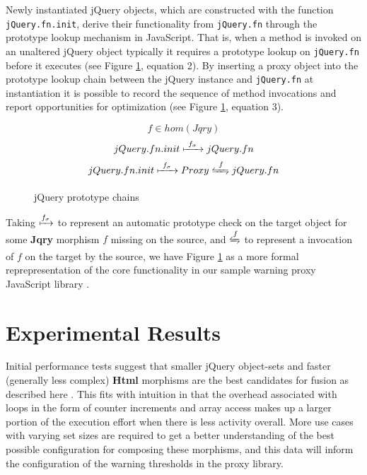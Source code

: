 \documentclass[preprint]{sigplanconf}
\begin{document}
Newly instantiated jQuery objects, which are constructed with the function \verb|jQuery.fn.init|, derive their functionality from \verb|jQuery.fn| through the prototype lookup mechanism in JavaScript. That is, when a method is invoked on an unaltered jQuery object typically it requires a prototype lookup on \verb|jQuery.fn| before it executes (see Figure \ref{eq:jquery-proto}, equation 2). By inserting a proxy object into the prototype lookup chain between the jQuery instance and \verb|jQuery.fn| at instantiation it is possible to record the sequence of method invocations and report opportunities for optimization (see Figure \ref{eq:jquery-proto}, equation 3).

\begin{figure}
\begin{equation}
 f \in hom(Jqry)
\end{equation}
\begin{equation} jQuery.fn.init \xmapsto{\ f_{\sigma}\ } jQuery.fn
\end{equation}
\begin{equation}
 jQuery.fn.init \xmapsto{\ f_{\sigma}\ } Proxy \xleftrightharpoons{\ f\ } jQuery.fn
\end{equation}
\nocaptionrule \caption{jQuery prototype chains}
\label{eq:jquery-proto}
\end{figure}

Taking \begin{math}\xmapsto{f_{\sigma}}\end{math} to represent an automatic prototype check on the target object for some \textbf{Jqry} morphism \begin{math}f\end{math} missing on the source, and \begin{math}\xleftrightharpoons{f}\end{math} to represent a invocation of \begin{math}f\end{math} on the target by the source, we have Figure \ref{eq:jquery-proto} as a more formal reprepresentation of the core functionality in our sample warning proxy JavaScript library \cite{bib:github-warning-proxy}.

\section{Experimental Results}

Initial performance tests suggest that smaller jQuery object-sets and faster (generally less complex) \textbf{Html} morphisms are the best candidates for fusion as described here \cite{bib:perf}. This fits with intuition in that the overhead associated with loops in the form of counter increments and array access makes up a larger portion of the execution effort when there is less activity overall. More use cases with varying set sizes are required to get a better understanding of the best possible configuration for composing these morphisms, and this data will inform the configuration of the warning thresholds in the proxy library.
\end{document}
